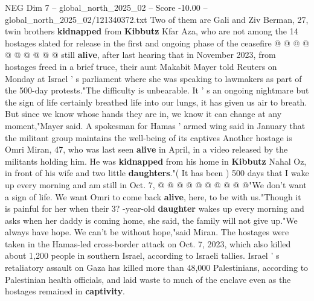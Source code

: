 \begin{textsample}{NEG Dim 7 – global\_north\_2025\_02 – Score -10.00 – global\_north\_2025\_02/121340372.txt}
Two of them are Gali and Ziv Berman, 27, twin brothers \textbf{kidnapped} from \textbf{Kibbutz} Kfar Aza, who are not among the 14 hostages slated for release in the first and ongoing phase of the ceasefire @ @ @ @ @ @ @ @ @ @ still \textbf{alive}, after last hearing that in November 2023, from hostages freed in a brief truce, their aunt Makabit Mayer told Reuters on Monday at Israel ' s parliament where she was speaking to lawmakers as part of the 500-day protests."The difficulty is unbearable.
It ' s an ongoing nightmare but the sign of life certainly breathed life into our lungs, it has given us air to breath.
But since we know whose hands they are in, we know it can change at any moment,"Mayer said.
A spokesman for Hamas ' armed wing said in January that the militant group maintains the well-being of its captives Another hostage is Omri Miran, 47, who was last seen \textbf{alive} in April, in a video released by the militants holding him.
He was \textbf{kidnapped} from his home in \textbf{Kibbutz} Nahal Oz, in front of his wife and two little \textbf{daughters}."( It has been ) 500 days that I wake up every morning and am still in Oct. 7, @ @ @ @ @ @ @ @ @ @"We don't want a sign of life.
We want Omri to come back \textbf{alive}, here, to be with us."Though it is painful for her when their 3? -year-old \textbf{daughter} wakes up every morning and asks when her daddy is coming home, she said, the family will not give up."We always have hope.
We can't be without hope,"said Miran.
The hostages were taken in the Hamas-led cross-border attack on Oct. 7, 2023, which also killed about 1,200 people in southern Israel, according to Israeli tallies.
Israel ' s retaliatory assault on Gaza has killed more than 48,000 Palestinians, according to Palestinian health officials, and laid waste to much of the enclave even as the hostages remained in \textbf{captivity}.

\end{textsample}
